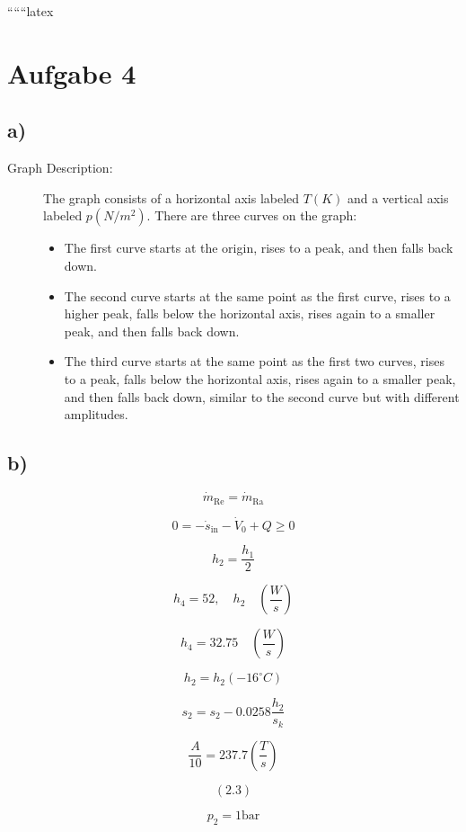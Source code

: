 
``````latex


\section*{Aufgabe 4}

\subsection*{a)}

\begin{description}
    \item[Graph Description:] The graph consists of a horizontal axis labeled \( T(K) \) and a vertical axis labeled \( p(N/m^2) \). There are three curves on the graph:
    \begin{itemize}
        \item The first curve starts at the origin, rises to a peak, and then falls back down.
        \item The second curve starts at the same point as the first curve, rises to a higher peak, falls below the horizontal axis, rises again to a smaller peak, and then falls back down.
        \item The third curve starts at the same point as the first two curves, rises to a peak, falls below the horizontal axis, rises again to a smaller peak, and then falls back down, similar to the second curve but with different amplitudes.
    \end{itemize}
\end{description}

\subsection*{b)}

\[
\dot{m}_{\text{Re}} = \dot{m}_{\text{Ra}}
\]

\[
0 = -\dot{s}_{\text{in}} - \dot{V}_0 + Q \geq 0
\]

\[
h_2 = \frac{h_1}{2}
\]

\[
h_4 = 52, \quad h_2 \quad \left( \frac{W}{s} \right)
\]

\[
h_4 = 32.75 \quad \left( \frac{W}{s} \right)
\]

\[
h_2 = h_2(-16^\circ C)
\]

\[
s_2 = s_2 - 0.0258 \frac{h_2}{s_k}
\]

\[
\frac{A}{10} = 237.7 \left( \frac{T}{s} \right)
\]

\[
(2.3)
\]

\[
p_2 = 1 \text{bar}
\]

